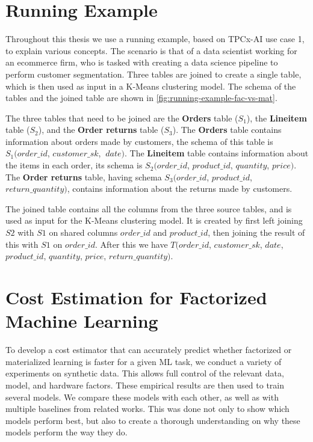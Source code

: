 \section{Running Example}
Throughout this thesis we use a running example, based on TPCx-AI\cite{tpcx-ai} use case 1, to explain various concepts. The scenario is that of a data scientist working for an ecommerce firm, who is tasked with creating a data science pipeline to perform customer segmentation. Three tables are joined to create a single table, which is then used as input in a K-Means clustering model. The schema of the tables and the joined table are shown in \autoref{fig:running-example-fac-vs-mat}.

The three tables that need to be joined are the \textbf{Orders} table ($S_1$), the \textbf{Lineitem} table ($S_2$), and the \textbf{Order returns} table ($S_3$). The \textbf{Orders} table contains information about orders made by customers, the schema of this table is $S_1(order\_id$, $customer\_sk$, $\ date)$. The \textbf{Lineitem} table contains information about the items in each order, its schema is $S_2(order\_id$, $product\_id$, $quantity$,  $price)$. The \textbf{Order returns} table, having schema $S_3(order\_id$, $product\_id$, $return\_quantity)$, contains information about the returns made by customers.

The joined table contains all the columns from the three source tables, and is used as input for the K-Means clustering model. It is created by first left joining $S2$ with $S1$ on shared columns $order\_id$ and $product\_id$, then joining the result of this with $S1$ on $order\_id$. After this we have $T(order\_id$, $customer\_sk$, $date$, $product\_id$, $quantity$, $price$, $return\_quantity)$.

\section{Cost Estimation for Factorized Machine Learning}
To develop a cost estimator that can accurately predict whether factorized or materialized learning is faster for a given ML task, we conduct a variety of experiments on synthetic data. This allows full control of the relevant data, model, and hardware factors. These empirical results are then used to train several models. We compare these models with each other, as well as with multiple baselines from related works. This was done not only to show which models perform best, but also to create a thorough understanding on why these models perform the way they do.

